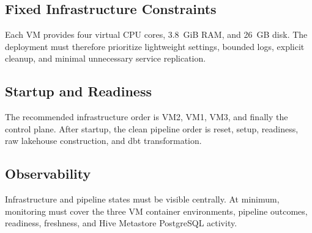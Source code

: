 \subsection{Fixed Infrastructure Constraints}
Each VM provides four virtual CPU cores, 3.8~GiB RAM, and 26~GB disk. The deployment must therefore prioritize lightweight settings, bounded logs, explicit cleanup, and minimal unnecessary service replication.

\subsection{Startup and Readiness}
The recommended infrastructure order is VM2, VM1, VM3, and finally the control plane. After startup, the clean pipeline order is reset, setup, readiness, raw lakehouse construction, and dbt transformation.

\subsection{Observability}
Infrastructure and pipeline states must be visible centrally. At minimum, monitoring must cover the three VM container environments, pipeline outcomes, readiness, freshness, and Hive Metastore PostgreSQL activity.

